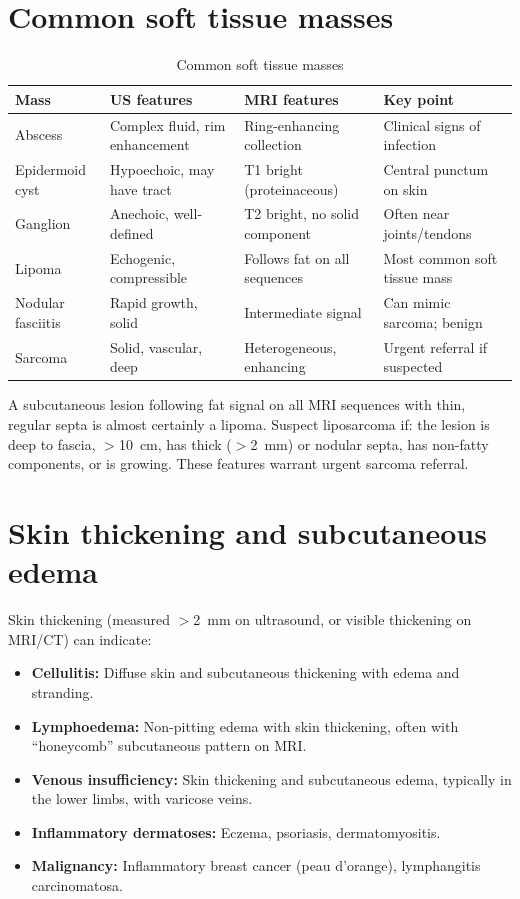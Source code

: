 \section{Common soft tissue masses}

\begin{table}[h]
\centering
\caption{Common soft tissue masses}
\label{tab:st_masses}
\begin{tabular}{@{}p{}p{}p{}p{}@{}}
\hline
\textbf{Mass} & \textbf{US features} & \textbf{MRI features} & \textbf{Key point} \\
\hline
Abscess & Complex fluid, rim enhancement & Ring-enhancing collection & Clinical signs of infection \\
Epidermoid cyst & Hypoechoic, may have tract & T1 bright (proteinaceous) & Central punctum on skin \\
Ganglion & Anechoic, well-defined & T2 bright, no solid component & Often near joints/tendons \\
Lipoma & Echogenic, compressible & Follows fat on all sequences & Most common soft tissue mass \\
Nodular fasciitis & Rapid growth, solid & Intermediate signal & Can mimic sarcoma; benign \\
Sarcoma & Solid, vascular, deep & Heterogeneous, enhancing & Urgent referral if suspected \\
\hline
\end{tabular}
\end{table}

\begin{pearlbox}
A subcutaneous lesion following fat signal on all MRI sequences with thin, regular septa is almost certainly a lipoma. Suspect liposarcoma if: the lesion is deep to fascia, $>$10~cm, has thick ($>$2~mm) or nodular septa, has non-fatty components, or is growing. These features warrant urgent sarcoma referral.
\end{pearlbox}

\section{Skin thickening and subcutaneous edema}
Skin thickening (measured $>$2~mm on ultrasound, or visible thickening on MRI/CT) can indicate:
\begin{itemize}
    \item \textbf{Cellulitis:} Diffuse skin and subcutaneous thickening with edema and stranding.
    \item \textbf{Lymphoedema:} Non-pitting edema with skin thickening, often with ``honeycomb'' subcutaneous pattern on MRI.
    \item \textbf{Venous insufficiency:} Skin thickening and subcutaneous edema, typically in the lower limbs, with varicose veins.
    \item \textbf{Inflammatory dermatoses:} Eczema, psoriasis, dermatomyositis.
    \item \textbf{Malignancy:} Inflammatory breast cancer (peau d'orange), lymphangitis carcinomatosa.
\end{itemize}

